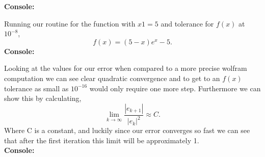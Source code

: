 \documentclass[12pt]{article}
\makeatletter
\theoremstyle{homework}
\newenvironment{exercise}[1]
{\def\@currentlabel{#1}\exercisecore}
{\endexercisecore}
\makeatother
\begin{document}
\begin{exercise}{Chapter 4: 2 (b)}
\textbf{Console:}

Running our routine for the function with $x1 = 5$ and tolerance for $f(x)$ at $10^{-8}$,
\begin{equation*}
  f(x) = (5-x)e^x - 5.
\end{equation*}
\textbf{Console:}

Looking at the values for our error when compared to a more precise wolfram computation we can see clear quadratic convergence and to get to an $f(x)$ tolerance as small as $10^{-16}$ would only require one more step.
Furthermore we can show this by calculating, 
\begin{equation*}
  \lim_{k\to\infty} \dfrac{|e_{k+1}|}{|e_{k}|^2} \approx C.
\end{equation*} 
Where C is a constant, and luckily since our error converges so fast we can see that after the first iteration this limit will be approximately 1.\\

\textbf{Console:}








\end{exercise}
\end{document}

